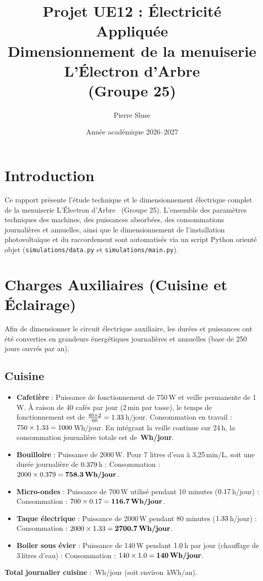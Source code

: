 \documentclass[11pt,a4paper]{article}
\title{\textbf{Projet UE12 : Électricité Appliquée}\\Dimensionnement de la menuiserie \og L'Électron d'Arbre \fg\\(Groupe 25)}
\author{Pierre Sluse}
\date{Année académique 2026--2027}
\begin{document}
\maketitle

\section{Introduction}
Ce rapport présente l'étude technique et le dimensionnement électrique complet de la menuiserie \og L'Électron d'Arbre \fg\ (Groupe 25). 
L'ensemble des paramètres techniques des machines, des puissances absorbées, des consommations journalières et annuelles, ainsi que le dimensionnement de l'installation photovoltaïque et du raccordement sont automatisés via un script Python orienté objet (\texttt{simulations/data.py} et \texttt{simulations/main.py}).

\section{Charges Auxiliaires (Cuisine et Éclairage)}
Afin de dimensionner le circuit électrique auxiliaire, les durées et puissances ont été converties en grandeurs énergétiques journalières et annuelles (base de 250 jours ouvrés par an).

\subsection{Cuisine}
\begin{itemize}
    \item \textbf{Cafetière} : Puissance de fonctionnement de 750\,W et veille permanente de 1\,W. À raison de 40 cafés par jour (2\,min par tasse), le temps de fonctionnement est de $\frac{40 \times 2}{60} = 1.33$\,h/jour.
    Consommation en travail : $750 \times 1.33 = 1000$\,Wh/jour. En intégrant la veille continue sur 24\,h, la consommation journalière totale est de \textbf{\ValECafetiereVeille\,Wh/jour}.
    \item \textbf{Bouilloire} : Puissance de 2000\,W. Pour 7 litres d'eau à 3,25\,min/L, soit une durée journalière de $0.379$\,h :
    Consommation : $2000 \times 0.379 = \textbf{758.3\,Wh/jour}$.
    \item \textbf{Micro-ondes} : Puissance de 700\,W utilisé pendant 10 minutes ($0.17$\,h/jour) :
    Consommation : $700 \times 0.17 = \textbf{116.7\,Wh/jour}$.
    \item \textbf{Taque électrique} : Puissance de 2000\,W pendant 80 minutes ($1.33$\,h/jour) :
    Consommation : $2000 \times 1.33 = \textbf{2700.7\,Wh/jour}$.
    \item \textbf{Boiler sous évier} : Puissance de 140\,W pendant $1.0$\,h par jour (chauffage de 3\,litres d'eau) :
    Consommation : $140 \times 1.0 = \textbf{140\,Wh/jour}$.
\end{itemize}
\textbf{Total journalier cuisine} : \ValECuisineTotal\,Wh/jour (soit environ \ValECuisineTotalKWh\,kWh/an).
\end{document}
